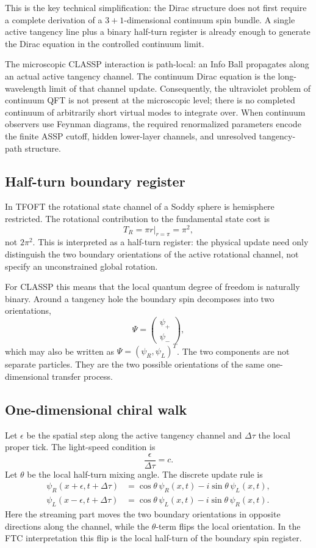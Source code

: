 \documentclass[11pt,a4paper]{article}
\begin{document}
This is the key technical simplification: the Dirac structure does not first
require a complete derivation of a \(3+1\)-dimensional continuum spin bundle.
A single active tangency line plus a binary half-turn register is already
enough to generate the Dirac equation in the controlled continuum limit.

The microscopic CLASSP interaction is path-local: an Info Ball propagates along
an actual active tangency channel.  The continuum Dirac equation is the
long-wavelength limit of that channel update.  Consequently, the ultraviolet
problem of continuum QFT is not present at the microscopic level; there is no
completed continuum of arbitrarily short virtual modes to integrate over.
When continuum observers use Feynman diagrams, the required renormalized
parameters encode the finite ASSP cutoff, hidden lower-layer channels, and
unresolved tangency-path structure.

\subsection{Half-turn boundary register}

In TFOFT the rotational state channel of a Soddy sphere is hemisphere
restricted.  The rotational contribution to the fundamental state cost is
\[
  T_R=\pi r\big|_{r=\pi}=\pi^2,
\]
not \(2\pi^2\).  This is interpreted as a half-turn register: the physical
update need only distinguish the two boundary orientations of the active
rotational channel, not specify an unconstrained global rotation.

For CLASSP this means that the local quantum degree of freedom is naturally
binary.  Around a tangency hole the boundary spin decomposes into two
orientations,
\[
  \Psi =
  \begin{pmatrix}
    \psi_+\\
    \psi_-
  \end{pmatrix},
\]
which may also be written as \(\Psi=(\psi_R,\psi_L)^T\).  The two components
are not separate particles.  They are the two possible orientations of the same
one-dimensional transfer process.

\subsection{One-dimensional chiral walk}

Let \(\epsilon\) be the spatial step along the active tangency channel and
\(\Delta\tau\) the local proper tick.  The light-speed condition is
\[
  \frac{\epsilon}{\Delta\tau}=c.
\]
Let \(\theta\) be the local half-turn mixing angle.  The discrete update rule is
\begin{align}
  \psi_R(x+\epsilon,t+\Delta\tau)
    &=\cos\theta\,\psi_R(x,t)-i\sin\theta\,\psi_L(x,t),
  \label{eq:walk_R}\\
  \psi_L(x-\epsilon,t+\Delta\tau)
    &=\cos\theta\,\psi_L(x,t)-i\sin\theta\,\psi_R(x,t).
  \label{eq:walk_L}
\end{align}
Here the streaming part moves the two boundary orientations in opposite
directions along the channel, while the \(\theta\)-term flips the local
orientation.  In the FTC interpretation this flip is the local half-turn of
the boundary spin register.
\end{document}
